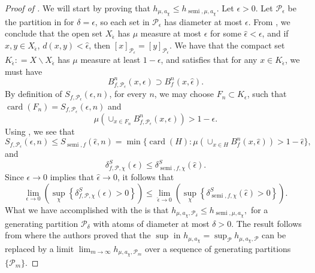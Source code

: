 \documentclass[oneside]{amsart}
\theoremstyle{plain}
\theoremstyle{definition}
\DeclareMathOperator{\card}{card}
\newcommand{\dfn}{\mathrel{\mathop:}=}
\newcommand{\<}{\langle}
\renewcommand{\>}{\rangle}
\renewcommand{\P}{\mathcal{P}}
\newcommand{\e}{\epsilon}
\renewcommand{\|}{|\!|} %
\newcommand{\semitop}{\operatorname{semi}} %
\begin{document}
\begin{proof}[Proof of ]
    We will start by proving that $h_{\mu,a_\chi} \le h_{\semitop,\mu,a_\chi}$. Let $\e>0$. 
    Let $\P_\e$ be the partition in  for $\delta = \e$, so each set in $\P_\e$ has diameter at most $\e$. From , we conclude that the open set $X_{\hat{\e}}$ has $\mu$ measure at most $\e$ for some $\hat{\e}<\e$, and if $x,y \in X_{\hat{\e}}$, $d(x,y)<\hat{\e}$, then $[x]_{\P_\e} = [y]_{\P_\e}$. 
    We have that the compact set $K_{\hat{\e}}\dfn X \backslash X_{\hat{\e}}$ has $\mu$ measure at least $1-\e$, and satisfies that for any $x \in K_{\hat{\e}}$, we must have
    \begin{equation}
        B^n_{f,\P_\e}(x,\e) \supset B^n_{f}(x,\hat{\e}).
        \label{eq:HammingBowen}
    \end{equation} 
    By definition of $S_{f,\P_\e}(\e,n)$, for every $n$, we may choose $F_n \subset K_{\e}$, such that $\card(F_n) = S_{f,\P_\e}(\e,n)$ and 
    \begin{equation*}
        \mu\left( \cup_{x \in F_n} B_{f,\P_\e}^n(x,\e)\right)>1-\e.
    \end{equation*}
    Using , we see that
    \begin{equation*}
        S_{f,\P_\e}(\e,n) \leq S_{\semitop,f}(\hat{\e},n) = \min\{\card(H):
        \mu\left( \cup_{x \in H} B^n_{f}(x,\hat{\e}) \right)>1-\hat{\e} \}, 
    \end{equation*}
    and 
    \begin{equation*}
        \delta_{f,\P,\chi}  ^S (\e) \leq \delta_{\semitop,f,\chi} ^S (\hat{\e}).
    \end{equation*}
    Since $\e \to 0$ implies that $\hat{\e} \to 0$, it follows that
    \begin{equation}
        \lim_{\e\to 0}\left(\sup_\chi\left\{\delta_{f,\P,\chi}  ^S (\e)>0\right\} \right)
        \le 
        \lim_{\hat{\e}\to 0}\left(\sup_\chi\left\{\delta_{\semitop,f,\chi} ^S (\hat{\e})>0\right\} \right).
    \label{eq:AlmostMeasureSmallerThanSemi}
    \end{equation}
    What we have accomplished with the  is that $h_{\mu,a_\chi,\P_\delta} \le h_{\semitop,\mu,a_\chi},$ for a generating partition $\P_\delta$ with atoms of diameter at most $\delta>0.$
     The result follows from  \cite[Proposition 1]{KatokThouvenot} where the authors proved that the $\sup$ in $h_{\mu,a_\chi}=\sup_\P h_{\mu,a_\chi,\P}$ can be replaced by a limit $\lim_{m\to\infty} h_{\mu,a_\chi,\P_m}$ over a sequence of generating partitions $\{\P_m\}$.


\end{proof}
\end{document}
